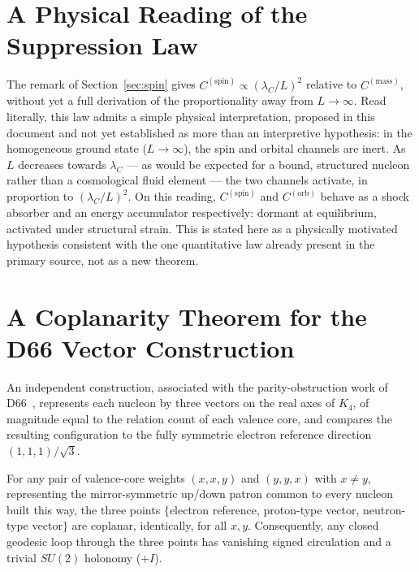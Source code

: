 \documentclass[11pt,a4paper]{article}
\newcommand{\Kfour}{K_4}
\newcommand{\lamC}{\lambda_C}
\newcommand{\Cmass}{C^{(\mathrm{mass})}}
\newcommand{\Cspin}{C^{(\mathrm{spin})}}
\newcommand{\Corb}{C^{(\mathrm{orb})}}
\begin{document}
\section{A Physical Reading of the Suppression Law}
\label{sec:reading}

\begin{explorbox}
The remark of Section~\ref{sec:spin} gives $\Cspin\propto(\lamC/L)^2$ relative to $\Cmass$, without yet a full derivation of the proportionality away from $L\to\infty$. Read literally, this law admits a simple physical interpretation, proposed in this document and not yet established as more than an interpretive hypothesis: in the homogeneous ground state ($L\to\infty$), the spin and orbital channels are inert. As $L$ decreases towards $\lamC$ --- as would be expected for a bound, structured nucleon rather than a cosmological fluid element --- the two channels activate, in proportion to $(\lamC/L)^2$. On this reading, $\Cspin$ and $\Corb$ behave as a shock absorber and an energy accumulator respectively: dormant at equilibrium, activated under structural strain. This is stated here as a physically motivated hypothesis consistent with the one quantitative law already present in the primary source, not as a new theorem.
\end{explorbox}

\section{A Coplanarity Theorem for the D66 Vector Construction}
\label{sec:coplanarity}

An independent construction, associated with the parity-obstruction work of D66~\citep{D66}, represents each nucleon by three vectors on the real axes of $\Kfour$, of magnitude equal to the relation count of each valence core, and compares the resulting configuration to the fully symmetric electron reference direction $(1,1,1)/\sqrt3$.

\begin{theorembox}
For any pair of valence-core weights $(x,x,y)$ and $(y,y,x)$ with $x\neq y$, representing the mirror-symmetric up/down patron common to every nucleon built this way, the three points $\{$electron reference, proton-type vector, neutron-type vector$\}$ are coplanar, identically, for all $x,y$. Consequently, any closed geodesic loop through the three points has vanishing signed circulation and a trivial $SU(2)$ holonomy ($+I$).
\end{theorembox}
\end{document}
